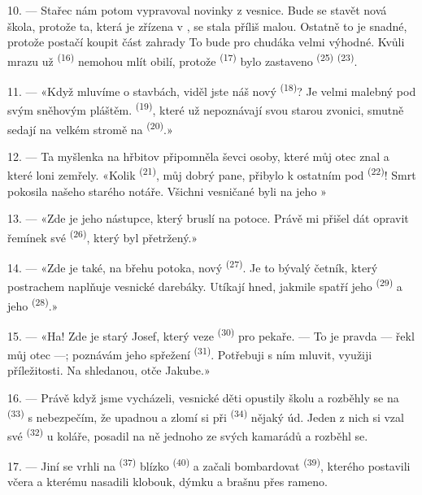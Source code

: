 10. --- Stařec nám potom vypravoval novinky z vesnice. Bude se stavět nová škola, protože ta,
která je zřízena v , se stala příliš malou. Ostatně to je snadné, protože
postačí koupit část zahrady  To bude pro chudáka velmi výhodné. Kvůli mrazu
už   \textsuperscript{(16)} nemohou mlít obilí, protože
 \textsuperscript{(17)} bylo zastaveno  \textsuperscript{(25)}
 \textsuperscript{(23)}.

11. --- «Když mluvíme o stavbách, viděl jste náš nový  \textsuperscript{(18)}?
Je velmi malebný pod svým sněhovým pláštěm.  \textsuperscript{(19)}, které už
nepoznávají svou starou zvonici, smutně sedají na velkém stromě na 
\textsuperscript{(20)}.»

12. --- Ta myšlenka na hřbitov připomněla ševci osoby, které můj otec znal a které loni
zemřely. «Kolik  \textsuperscript{(21)}, můj dobrý pane, přibylo k ostatním pod
 \textsuperscript{(22)}! Smrt pokosila našeho starého notáře. Všichni
vesničané byli na jeho »

13. --- «Zde je jeho nástupce, který bruslí na potoce. Právě mi přišel dát opravit řemínek své
 \textsuperscript{(26)}, který byl přetržený.»

14. --- «Zde je také, na břehu potoka, nový  \textsuperscript{(27)}. Je
to bývalý četník, který postrachem naplňuje vesnické darebáky. Utíkají hned, jakmile spatří
jeho  \textsuperscript{(29)} a jeho  \textsuperscript{(28)}.»

15. --- «Ha! Zde je starý Josef, který veze  \textsuperscript{(30)}
pro pekaře. --- To je pravda --- řekl můj otec ---; poznávám jeho spřežení 
\textsuperscript{(31)}. Potřebuji s ním mluvit, využiji příležitosti. Na shledanou, otče
Jakube.»

16. --- Právě když jsme vycházeli, vesnické děti opustily školu a rozběhly se na
 \textsuperscript{(33)} s nebezpečím, že upadnou a zlomí si při
 \textsuperscript{(34)} nějaký úd. Jeden z nich si vzal své 
\textsuperscript{(32)} u koláře, posadil na ně jednoho ze svých kamarádů a rozběhl se.

17. --- Jiní se vrhli na  \textsuperscript{(37)} blízko
 \textsuperscript{(40)} a začali bombardovat 
\textsuperscript{(39)}, kterého postavili včera a kterému nasadili klobouk, dýmku a brašnu
přes rameno.


